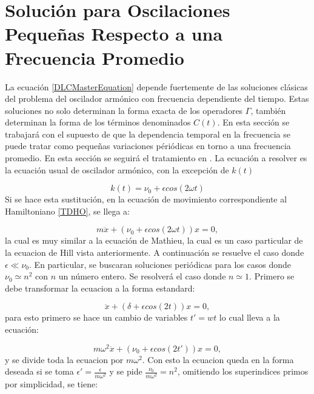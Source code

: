 \documentclass[a4paper,10pt]{report}
\begin{document}
\section{Solución para Oscilaciones Pequeñas Respecto a una Frecuencia Promedio}

La ecuación \ref{DLCMasterEquation} depende fuertemente de las soluciones clásicas del problema del oscilador armónico con frecuencia dependiente del tiempo. Estas soluciones no solo determinan la forma exacta de los operadores $\Gamma$, también determinan la forma de los términos denominados $C(t)$. En esta sección se trabajará con el supuesto de que la dependencia temporal en la frecuencia se puede tratar como pequeñas variaciones périódicas en torno a una frecuencia promedio. En esta sección se seguirá el tratamiento en \cite{WardFT}. La ecuación a resolver es la ecuación usual de oscilador armónico, con la excepción de $k(t)$ 

\begin{equation}
k(t) = \nu_0 + \epsilon cos(2\omega t)
\end{equation}Si se hace esta sustitución, en la ecuación de movimiento correspondiente al Hamiltoniano \ref{TDHO}, se llega a:

\begin{equation}
m\ddot{x} + (\nu_0 + \epsilon cos(2\omega t))x = 0,
\end{equation} la cual es muy similar a la ecuación de Mathieu, la cual es un caso particular de la ecuacion de Hill vista anteriormente. A continuación se resuelve el caso donde $\epsilon \ll \nu_0$. En particular, se buscaran soluciones periódicas para los casos donde $\nu_0 \simeq n^2$ con $n$ un número entero. Se resolverá el caso donde $n \simeq 1$. Primero se debe transformar la ecuacion a la forma estandard:

\begin{equation}
\ddot{x} + (\delta+\epsilon cos(2t))x=0,
\end{equation} para esto primero se hace un cambio de variables $t' = wt$ lo cual lleva a la ecuación:

\begin{equation}
m\omega^2\ddot{x}+(\nu_0+\epsilon cos(2t'))x=0,
\end{equation} y se divide toda la ecuacion por $m\omega^2$. Con esto la ecuacion queda en la forma deseada si se toma $\epsilon' = \frac{\epsilon}{m\omega^2}$ y se pide $\frac{\nu_0}{m\omega^2} = n^2$, omitiendo los superindices primos por simplicidad, se tiene:
\end{document}
